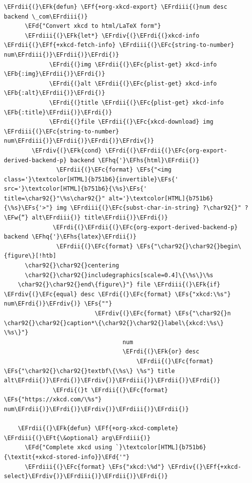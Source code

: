 \documentclass{scrartcl}
\newcommand{\EFk}[1]{\textcolor{EFk}{#1}} %
\newcommand{\EFd}[1]{\textcolor{EFd}{\textit{#1}}} %
\newcommand{\EFt}[1]{\textcolor{EFt}{#1}} %
\newcommand{\EFs}[1]{\textcolor{EFs}{#1}} %
\newcommand{\EFw}[1]{\textcolor{EFw}{#1}} %
\newcommand{\EFb}[1]{\textcolor{EFb}{#1}} %
\newcommand{\EFc}[1]{\textcolor{EFc}{#1}} %
\newcommand{\EFf}[1]{\textcolor{EFf}{#1}} %
\newcommand{\EFhq}[1]{\textcolor{EFhq}{#1}} %
\newcommand{\EFhs}[1]{\textcolor{EFhs}{#1}} %
\newcommand{\EFrdi}[1]{\textcolor{EFrdi}{#1}} %
\newcommand{\EFrdii}[1]{\textcolor{EFrdii}{#1}} %
\newcommand{\EFrdiii}[1]{\textcolor{EFrdiii}{#1}} %
\newcommand{\EFrdiv}[1]{\textcolor{EFrdiv}{#1}} %
\begin{document}
\begin{Code}
\begin{Verbatim}[]
	\EFrdii{(}\EFk{defun} \EFf{+org-xkcd-export} \EFrdiii{(}num desc backend \_com\EFrdiii{)}
	  \EFd{"Convert xkcd to html/LaTeX form"}
	  \EFrdiii{(}\EFk{let*} \EFrdiv{(}\EFrdi{(}xkcd-info \EFrdii{(}\EFf{+xkcd-fetch-info} \EFrdiii{(}\EFc{string-to-number} num\EFrdiii{)}\EFrdii{)}\EFrdi{)}
	         \EFrdi{(}img \EFrdii{(}\EFc{plist-get} xkcd-info \EFb{:img}\EFrdii{)}\EFrdi{)}
	         \EFrdi{(}alt \EFrdii{(}\EFc{plist-get} xkcd-info \EFb{:alt}\EFrdii{)}\EFrdi{)}
	         \EFrdi{(}title \EFrdii{(}\EFc{plist-get} xkcd-info \EFb{:title}\EFrdii{)}\EFrdi{)}
	         \EFrdi{(}file \EFrdii{(}\EFc{xkcd-download} img \EFrdiii{(}\EFc{string-to-number} num\EFrdiii{)}\EFrdii{)}\EFrdi{)}\EFrdiv{)}
	    \EFrdiv{(}\EFk{cond} \EFrdi{(}\EFrdii{(}\EFc{org-export-derived-backend-p} backend \EFhq{'}\EFhs{html}\EFrdii{)}
	           \EFrdii{(}\EFc{format} \EFs{"<img class='}\textcolor[HTML]{b751b6}{invertible}\EFs{' src='}\textcolor[HTML]{b751b6}{\%s}\EFs{' title=\char92{}"\%s\char92{}" alt='}\textcolor[HTML]{b751b6}{\%s}\EFs{'>"} img \EFrdiii{(}\EFc{subst-char-in-string} ?\char92{}" ?\EFw{“} alt\EFrdiii{)} title\EFrdii{)}\EFrdi{)}
	          \EFrdi{(}\EFrdii{(}\EFc{org-export-derived-backend-p} backend \EFhq{'}\EFhs{latex}\EFrdii{)}
	           \EFrdii{(}\EFc{format} \EFs{"\char92{}\char92{}begin\{figure\}[!htb]
	  \char92{}\char92{}centering
	  \char92{}\char92{}includegraphics[scale=0.4]\{\%s\}\%s
	\char92{}\char92{}end\{figure\}"} file \EFrdiii{(}\EFk{if} \EFrdiv{(}\EFc{equal} desc \EFrdi{(}\EFc{format} \EFs{"xkcd:\%s"} num\EFrdi{)}\EFrdiv{)} \EFs{""}
	                      \EFrdiv{(}\EFc{format} \EFs{"\char92{}n  \char92{}\char92{}caption*\{\char92{}\char92{}label\{xkcd:\%s\} \%s\}"}
	                              num
	                              \EFrdi{(}\EFk{or} desc
	                                  \EFrdii{(}\EFc{format} \EFs{"\char92{}\char92{}textbf\{\%s\} \%s"} title alt\EFrdii{)}\EFrdi{)}\EFrdiv{)}\EFrdiii{)}\EFrdii{)}\EFrdi{)}
	          \EFrdi{(}t \EFrdii{(}\EFc{format} \EFs{"https://xkcd.com/\%s"} num\EFrdii{)}\EFrdi{)}\EFrdiv{)}\EFrdiii{)}\EFrdii{)}
	
	\EFrdii{(}\EFk{defun} \EFf{+org-xkcd-complete} \EFrdiii{(}\EFt{\&optional} arg\EFrdiii{)}
	  \EFd{"Complete xkcd using `}\textcolor[HTML]{b751b6}{\textit{+xkcd-stored-info}}\EFd{'"}
	  \EFrdiii{(}\EFc{format} \EFs{"xkcd:\%d"} \EFrdiv{(}\EFf{+xkcd-select}\EFrdiv{)}\EFrdiii{)}\EFrdii{)}\EFrdi{)}
\end{Verbatim}
\end{Code}
\end{document}
